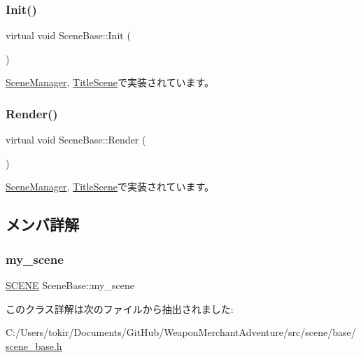 \subsubsection{\texorpdfstring{Init()}{Init()}}
{\footnotesize\ttfamily virtual void Scene\+Base\+::\+Init (\begin{DoxyParamCaption}{ }\end{DoxyParamCaption})\hspace{0.3cm}{\ttfamily [pure virtual]}}



\mbox{\hyperlink{class_scene_manager_a6c0e84d0e76f23fb3172839dba5f091b}{Scene\+Manager}}, \mbox{\hyperlink{class_title_scene_a3d039e7db0fa1e22e8c36d3cedfbd318}{Title\+Scene}}で実装されています。

\mbox{\label{class_scene_base_ad981674ce731ea267f398e889bbb9dc3}} 
\subsubsection{\texorpdfstring{Render()}{Render()}}
{\footnotesize\ttfamily virtual void Scene\+Base\+::\+Render (\begin{DoxyParamCaption}{ }\end{DoxyParamCaption})\hspace{0.3cm}{\ttfamily [pure virtual]}}



\mbox{\hyperlink{class_scene_manager_a968ae7a0065b793f139bda6bcc58d106}{Scene\+Manager}}, \mbox{\hyperlink{class_title_scene_af12c59b3bf9458640938c5ca620527ae}{Title\+Scene}}で実装されています。



\subsection{メンバ詳解}
\mbox{\label{class_scene_base_a18dcdbacfbd98f73099c3cbeb70ae3b8}} 
\subsubsection{\texorpdfstring{my\+\_\+scene}{my\_scene}}
{\footnotesize\ttfamily \mbox{\hyperlink{scene__base_8h_a24cee5343fb9d0706ead6e8601f363be}{S\+C\+E\+NE}} Scene\+Base\+::my\+\_\+scene\hspace{0.3cm}{\ttfamily [protected]}}



このクラス詳解は次のファイルから抽出されました\+:\begin{DoxyCompactItemize}
\item 
C\+:/\+Users/tokir/\+Documents/\+Git\+Hub/\+Weapon\+Merchant\+Adventure/src/scene/base/\mbox{\hyperlink{scene__base_8h}{scene\+\_\+base.\+h}}\end{DoxyCompactItemize}
